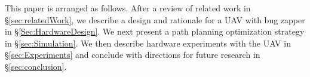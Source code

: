 %  
  This paper is arranged as follows.  
  After a review of related work in \S \ref{sec:relatedWork}, 
  we describe a design and rationale for a UAV with bug zapper in \S  \ref{Sec:HardwareDesign}.
    We next present a path planning optimization strategy in   \S \ref{sec:Simulation}.
  We then describe hardware experiments with the UAV  in \S  \ref{sec:Experiments} and conclude with directions for future research  in \S  \ref{sec:conclusion}.
  
